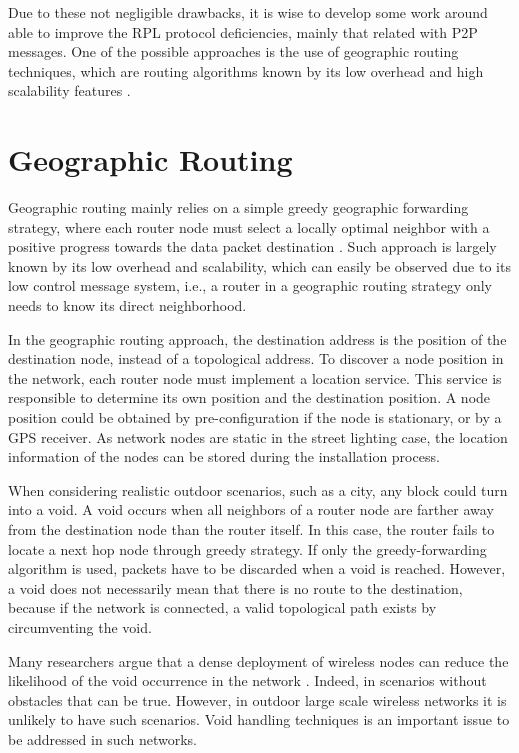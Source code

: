 \documentclass[authoryear,preprint,review,12pt]{elsarticle}
\begin{document}
Due to these not negligible drawbacks, it is wise to develop some work around able to improve the RPL protocol deficiencies, mainly that related with P2P messages. One of the possible approaches is the use of geographic routing techniques, which are routing algorithms known by its low overhead and high scalability features \citep{Karp_GPSR_2000, Position_Based_Routing_Ad_Hoc_2001, On_Optimal_Geographic_Routing_2007}.


\section{Geographic Routing}
\label{secGeographicRouting}

Geographic routing mainly relies on a simple greedy geographic forwarding strategy, where each router node must select a locally optimal neighbor with a positive progress towards the data packet destination \citep{survey_2007}. Such approach is largely known by its low overhead and scalability, which can easily be observed due to its low control message system, i.e., a router in a geographic routing strategy only needs to know its direct neighborhood.

In the geographic routing approach, the destination address is the position of the destination node, instead of a topological address. To discover a node position in the network, each router node must implement a location service. This service is responsible to determine its own position and the destination position. A node position could be obtained by pre-configuration if the node is stationary, or by a GPS receiver. As network nodes are static in the street lighting case, the location information of the nodes can be stored during the installation process. 

When considering realistic outdoor scenarios, such as a city, any block could turn into a void. A void occurs when all neighbors of a router node are farther away from the destination node than the router itself. In this case, the router fails to locate a next hop node through greedy strategy. If only the greedy-forwarding algorithm is used, packets have to be discarded when a void is reached. However, a void does not necessarily mean that there is no route to the destination, because if the network is connected, a valid topological path exists by circumventing the void. 

Many researchers argue that a dense deployment of wireless nodes can reduce the likelihood of the void occurrence in the network \citep{Position_Based_Routing_Ad_Hoc_2001, WSN_routing, survey_2007}. Indeed, in scenarios without obstacles that can be true. However, in outdoor large scale wireless networks it is unlikely to have such scenarios. Void handling techniques is an important issue to be addressed in such networks. 
\end{document}
